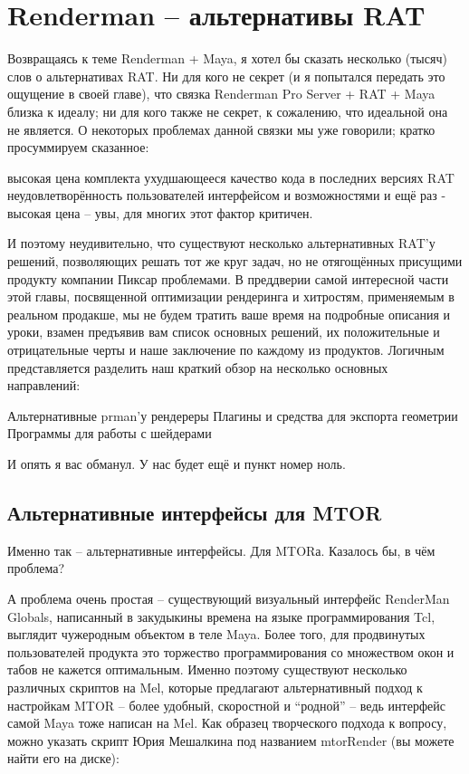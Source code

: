 \chapter*{Renderman – альтернативы RAT}
  

 Возвращаясь к теме Renderman + Maya, я хотел бы
    сказать несколько (тысяч) слов о альтернативах RAT. Ни для кого не
    секрет (и я попытался передать это ощущение в своей главе), что
    связка Renderman Pro Server + RAT + Maya близка к идеалу; ни для
    кого также не секрет, к сожалению, что идеальной она не является. О
    некоторых проблемах данной связки мы уже говорили; кратко
    просуммируем сказанное:
  
     высокая цена комплекта
     ухудшающееся качество кода в последних версиях
      RAT
     неудовлетворённость пользователей интерфейсом и
      возможностями
     и ещё раз - высокая цена – увы, для многих этот
      фактор критичен.
  
  

 И поэтому неудивительно, что существуют несколько
    альтернативных RAT’у решений, позволяющих решать тот же круг задач,
    но не отягощённых присущими продукту компании Пиксар проблемами. В
    преддверии самой интересной части этой главы, посвященной
    оптимизации рендеринга и хитростям, применяемым в реальном
    продакше, мы не будем тратить ваше время на подробные описания и
    уроки, взамен предъявив вам список основных решений, их
    положительные и отрицательные черты и наше заключение по каждому из
    продуктов. Логичным представляется разделить наш краткий обзор на
    несколько основных направлений:
  
     Альтернативные prman’у рендереры
     Плагины и средства для экспорта
      геометрии
     Программы для работы с шейдерами
  
  

 И опять я вас обманул. У нас будет ещё и пункт
    номер ноль.

  \section*{Альтернативные интерфейсы для MTOR}
  

 Именно так – альтернативные интерфейсы. Для MTORа.
    Казалось бы, в чём проблема?
  

 А проблема очень простая – существующий визуальный
    интерфейс RenderMan Globals, написанный в закудыкины времена на
    языке программирования Tcl, выглядит чужеродным объектом в теле
    Maya. Более того, для продвинутых пользователей продукта это
    торжество программирования со множеством окон и табов не кажется
    оптимальным. Именно поэтому существуют несколько различных скриптов
    на Mel, которые предлагают альтернативный подход к настройкам MTOR
    – более удобный, скоростной и “родной” – ведь интерфейс самой Maya
    тоже написан на Mel. Как образец творческого подхода к вопросу,
    можно указать скрипт Юрия Мешалкина под названием mtorRender (вы
    можете найти его на диске):
  

